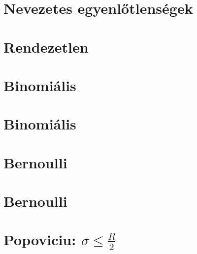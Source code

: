








\begin{spacing}{1.2}

\section*{Nevezetes egyenlőtlenségek} \label{DB}
\newpage
\section*{Rendezetlen} \label{DBuno}
\newline
{}
\newline
{}
\newline
{}
\vspace{0.5cm}
\newpage
\section*{Binomiális} \label{DBuno1}
\Fa{

}
\vspace{0.5cm}
\newpage
\section*{Binomiális} \label{DBuno1Mo}
\Mo{

}
\vspace{0.5cm}
\newpage
\section*{Bernoulli} \label{DBuno2}
\Fa{

}
\vspace{0.5cm}
\newpage
\section*{Bernoulli} \label{DBuno2Mo}
\Mo{

}
\vspace{0.5cm}
\newpage
\section*{Popoviciu: $\sigma\le\frac{R}{2}$} \label{DBuno3}
\Fa{

}
\vspace{0.5cm}
\newpage

\end{spacing}
